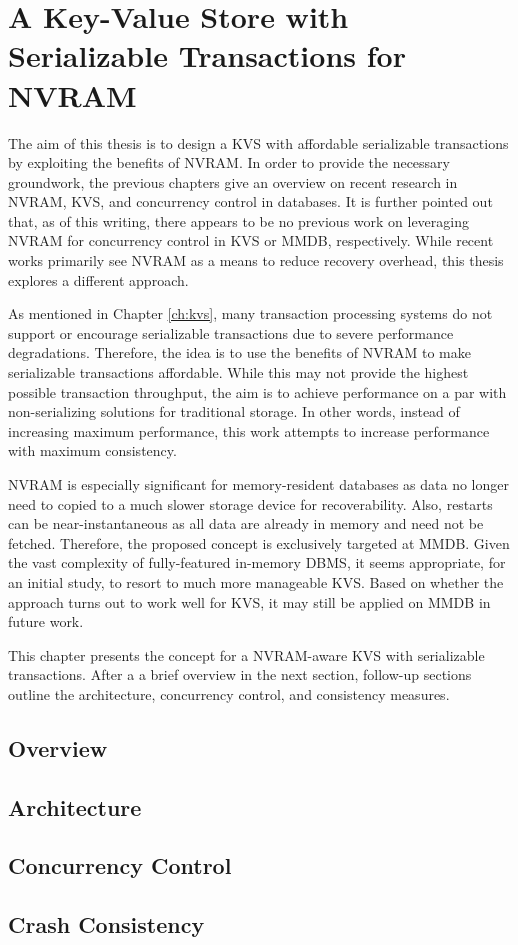 \chapter{A Key-Value Store with Serializable Transactions for NVRAM}
\label{ch:concept}

The aim of this thesis is to design a KVS with affordable serializable
transactions by exploiting the benefits of NVRAM. In order to provide the
necessary groundwork, the previous chapters give an overview on recent research
in NVRAM, KVS, and concurrency control in databases. It is further pointed out
that, as of this writing, there appears to be no previous work on leveraging
NVRAM for concurrency control in KVS or MMDB, respectively. While recent works
primarily see NVRAM as a means to reduce recovery overhead, this thesis explores
a different approach.

As mentioned in Chapter \ref{ch:kvs}, many transaction processing systems do not
support or encourage serializable transactions due to severe performance
degradations. Therefore, the idea is to use the benefits of NVRAM to make
serializable transactions affordable. While this may not provide the highest
possible transaction throughput, the aim is to achieve performance on a par with
non-serializing solutions for traditional storage. In other words, instead of
increasing maximum performance, this work attempts to increase performance with
maximum consistency.

NVRAM is especially significant for memory-resident databases as data no longer
need to copied to a much slower storage device for recoverability. Also,
restarts can be near-instantaneous as all data are already in memory and need
not be fetched. Therefore, the proposed concept is exclusively targeted at MMDB.
Given the vast complexity of fully-featured in-memory DBMS, it seems
appropriate, for an initial study, to resort to much more manageable KVS. Based
on whether the approach turns out to work well for KVS, it may still be applied
on MMDB in future work.

This chapter presents the concept for a NVRAM-aware KVS with serializable
transactions. After a a brief overview in the next section, follow-up sections
outline the architecture, concurrency control, and consistency measures.

\section{Overview}
\label{sec:concept-overview}


\section{Architecture}
\label{sec:concept-arch}


\section{Concurrency Control}
\label{sec:concept-cc}

\section{Crash Consistency}
\label{sec:concept-concistency}

